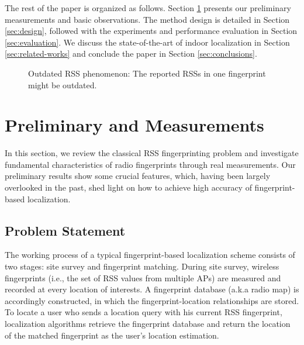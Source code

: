 \documentclass[10pt,conference,compsocconf,letterpaper]{./sty/IEEEtran}
\def\3figwidth{0.3\textwidth}
\begin{document}
The rest of the paper is organized as follows. Section \ref{sec:measurements} presents our preliminary measurements and basic observations. The method design is detailed in Section \ref{sec:design}, followed with the experiments and performance evaluation in Section \ref{sec:evaluation}. We discuss the state-of-the-art of indoor localization in Section \ref{sec:related-works} and conclude the paper in Section \ref{sec:conclusions}.


\begin{figure*}[t]
	\centering
		\hfill	
	\caption{Outdated RSS phenomenon: The reported RSSs in one fingerprint might be outdated.}
	\label{fig:OutdatedRSS}
\end{figure*}


\section{Preliminary and Measurements}
\label{sec:measurements}









In this section, we review the classical RSS fingerprinting problem and investigate fundamental characteristics of radio fingerprints through real measurements. Our preliminary results show some crucial features, which, having been largely overlooked in the past, shed light on how to achieve high accuracy of fingerprint-based localization.

\subsection{Problem Statement}
\label{sec:problem}

The working process of a typical fingerprint-based localization scheme consists of two stages: site survey and fingerprint matching. During site survey, wireless fingerprints (i.e., the set of RSS values from multiple APs) are measured and recorded at every location of interests. A fingerprint database (a.k.a radio map) is accordingly constructed, in which the fingerprint-location relationships are stored. To locate a user who sends a location query with his current RSS fingerprint, localization algorithms retrieve the fingerprint database and return the location of the matched fingerprint as the user's location estimation.
\end{document}

